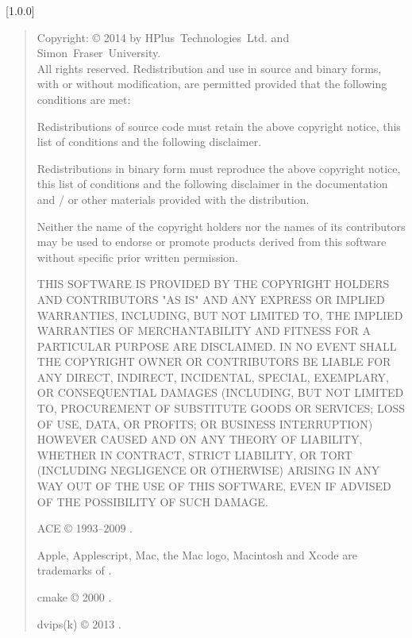 [1.0.0]
\begin{quote}
\begin{small}
Copyright: \copyright{} 2014 by HPlus~Technologies~Ltd. and Simon~Fraser~University.
\\
All rights reserved. Redistribution and use in source and binary forms, with or without
modification, are permitted provided that the following conditions are met:
\begin{tightItems}
\item Redistributions of source code must retain the above copyright notice, this list of
conditions and the following disclaimer.
\item Redistributions in binary form must reproduce the above copyright notice, this list
of conditions and the following disclaimer in the documentation and / or other materials
provided with the distribution.
\item Neither the name of the copyright holders nor the names of its contributors may be
used to endorse or promote products derived from this software without specific prior
written permission.
\end{tightItems}
THIS SOFTWARE IS PROVIDED BY THE COPYRIGHT HOLDERS AND CONTRIBUTORS "AS IS" AND ANY
EXPRESS OR IMPLIED WARRANTIES, INCLUDING, BUT NOT LIMITED TO, THE IMPLIED WARRANTIES OF
MERCHANTABILITY AND FITNESS FOR A PARTICULAR PURPOSE ARE DISCLAIMED.
IN NO EVENT SHALL THE COPYRIGHT OWNER OR CONTRIBUTORS BE LIABLE FOR ANY DIRECT, INDIRECT,
INCIDENTAL, SPECIAL, EXEMPLARY, OR CONSEQUENTIAL DAMAGES (INCLUDING, BUT NOT LIMITED TO,
PROCUREMENT OF SUBSTITUTE GOODS OR SERVICES; LOSS OF USE, DATA, OR PROFITS; OR BUSINESS
INTERRUPTION) HOWEVER CAUSED AND ON ANY THEORY OF LIABILITY, WHETHER IN CONTRACT, STRICT
LIABILITY, OR TORT (INCLUDING NEGLIGENCE OR OTHERWISE) ARISING IN ANY WAY OUT OF THE USE
OF THIS SOFTWARE, EVEN IF ADVISED OF THE POSSIBILITY OF SUCH DAMAGE.

ACE \copyright{} 1993--2009
.

Apple, Applescript, Mac, the Mac logo, Macintosh and Xcode are trademarks of
.

cmake \copyright{} 2000
.

dvips(k) \copyright{} 2013
.


\end{small}
\end{quote}
